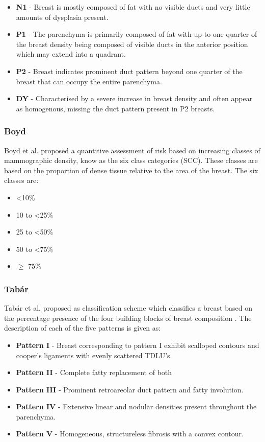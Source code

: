 \begin{itemize}
	\item \textbf{N1} - Breast is mostly composed of fat with no visible ducts and very little amounts of dysplasia present. 
	\item \textbf{P1} - The parenchyma is primarily composed of fat with up to one quarter of the breast density being composed of visible ducts in the anterior position which may extend into a quadrant.
	\item \textbf{P2} - Breast indicates prominent duct pattern beyond one quarter of the breast that can occupy the entire parenchyma.
	\item \textbf{DY} - Characterised by a severe increase in breast density and often appear as homogenous, missing the duct pattern present in P2 breasts.
\end{itemize}

\subsubsection{Boyd}
Boyd et al. \cite{boyd1995quantitative} proposed a quantitive assessment of risk based on increasing classes of mammographic density, know as the six class categories (SCC). These classes are based on the proportion of dense tissue relative to the area of the breast. The six classes are:

\begin{itemize}
	\item \textless 10\% 
	\item 10 to \textless 25\% 
	\item 25 to \textless 50\%
	\item 50 to \textless 75\%
	\item $\geq$ 75\%
\end{itemize}

\subsubsection{Tab\'{a}r}
Tab\'{a}r et al. \cite{gram1997tabar} proposed as classification scheme which classifies a breast based on the percentage presence of the four building blocks of breast composition \cite{gram1997tabar, tabar2005breast}. The description of each of the five patterns is given as:

\begin{itemize}
	\item \textbf{Pattern I} - Breast corresponding to pattern I exhibit scalloped contours and cooper's ligaments with evenly scattered TDLU's.
	\item \textbf{Pattern II} - Complete fatty replacement of both
	\item \textbf{Pattern III} - Prominent retroareolar duct pattern and fatty involution.
	\item \textbf{Pattern IV} - Extensive linear and nodular densities present throughout the parenchyma.
	\item \textbf{Pattern V} - Homogeneous, structureless fibrosis with a convex contour.
\end{itemize}


